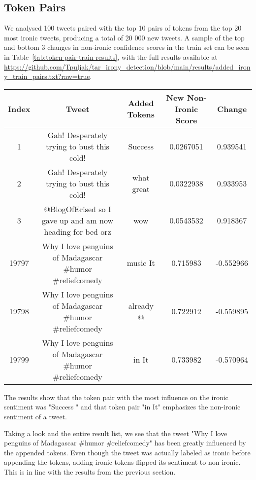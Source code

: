 \documentclass[10pt, a4paper]{article}
\begin{document}
\subsection{Token Pairs}

We analysed 100 tweets paired with the top 10 pairs of tokens from the top 20 most ironic tweets, producing a total of 20 000 new tweets.
A sample of the top and bottom 3 changes in non-ironic confidence scores in the train set can be seen in Table~\ref{tab:token-pair-train-results}, with the full results available at \url{https://github.com/Tpuljak/tar_irony_detection/blob/main/results/added_irony_train_pairs.txt?raw=true}.

\begin{table*}
\caption{Sample of Token Pair Results on the Train Set}
\label{tab:token-pair-train-results}
\begin{center}
\begin{tabular}{c|c|c|c|c}
\toprule
Index & Tweet & Added Tokens & New Non-Ironic Score & Change\\
\midrule
1     & Gah! Desperately trying to bust this cold!                & Success \textvisiblespace & 0.0267051 & 0.939541  \\
2     & Gah! Desperately trying to bust this cold!                & what great                & 0.0322938 & 0.933953  \\
3     & @BlogOfErised so I gave up and am now heading for bed orz & wow \textvisiblespace     & 0.0543532 & 0.918367  \\
19797 & Why I love penguins of Madagascar \#humor \#reliefcomedy  & music It                  & 0.715983  & -0.552966 \\
19798 & Why I love penguins of Madagascar \#humor \#reliefcomedy  & already @                 & 0.722912  & -0.559895 \\
19799 & Why I love penguins of Madagascar \#humor \#reliefcomedy  & in It                     & 0.733982  & -0.570964 \\
\bottomrule
\end{tabular}
\end{center}
\end{table*}

The results show that the token pair with the most influence on the ironic sentiment was "Success \textvisiblespace " and that token pair "in It" emphasizes the non-ironic sentiment of a tweet.

Taking a look and the entire result list, we see that the tweet "Why I love penguins of Madagascar  \#humor \#reliefcomedy" has been greatly influenced by the appended tokens.
Even though the tweet was actually labeled as ironic before appending the tokens, adding ironic tokens flipped its sentiment to non-ironic.
This is in line with the results from the previous section.
\end{document}
